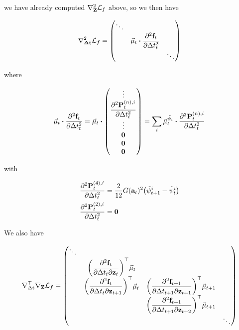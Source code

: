 \documentclass{article}
\newcommand{\isopsi}{\tilde \psi}
\begin{document}
we have already computed $\nabla_{\vb{Z}}^2 \mathcal{L}_f$ above, so we then have

\begin{equation}
  \nabla_{\vb{\Delta \vb{t}}}^2 \mathcal{L}_f = 
  \mqty(
    \ddots \\
    & \displaystyle \vec \mu_t \vdot \pdv[2]{\vb{f}_t}{\Delta t_t} \\
    & & \ddots \\
  )
\end{equation}

where

\begin{equation}
  \vec \mu_t \vdot \pdv[2]{\vb{f}_t}{\Delta t_t} = 
  \vec \mu_t \vdot \mqty(
    \vdots \\
    \displaystyle \pdv[2]{\vb{P}^{(n),i}_t}{\Delta t_t} \\
    \vdots \\
    \vb{0} \\
    \vb{0} \\
    \vb{0} \\
  ) = 
  \sum_i \vec \mu_t^{\isopsi_i} \vdot \pdv[2]{\vb{P}^{(n),i}_t}{\Delta t_t}
\end{equation}

with 

\begin{align}
  \pdv[2]{\vb{P}^{(4),i}_t}{\Delta t_t} 
  &= \frac{2}{12} G(\vb{a}_t)^2 \qty(\isopsi^i_{t+1} - \isopsi^i_t) \\
  \pdv[2]{\vb{P}^{(2),i}_t}{\Delta t_t} 
  &= \vb{0} 
\end{align}


We also have

\begin{equation}
  \nabla^\top_{\Delta \vb{t}} \nabla_{\vb{Z}} \mathcal{L}_f 
  = \mqty(
    \ddots \\
    & \qty( \displaystyle \pdv{\vb{f}_t}{\Delta t_t}{\vb{z}_t} )^\top \vec \mu_t \\ 
    & \qty( \displaystyle \pdv{\vb{f}_t}{\Delta t_t}{\vb{z}_{t+1}} )^\top \vec \mu_t  
    & \qty( \displaystyle \pdv{\vb{f}_{t+1}}{\Delta t_{t+1}}{\vb{z}_{t+1}} )^\top \vec \mu_{t+1} \\ 
    & & \qty( \displaystyle \pdv{\vb{f}_{t+1}}{\Delta t_{t+1}}{\vb{z}_{t+2}} )^\top \vec \mu_{t+1} \\ 
    & & & \ddots \\
  ) \\ 
\end{equation}
\end{document}
